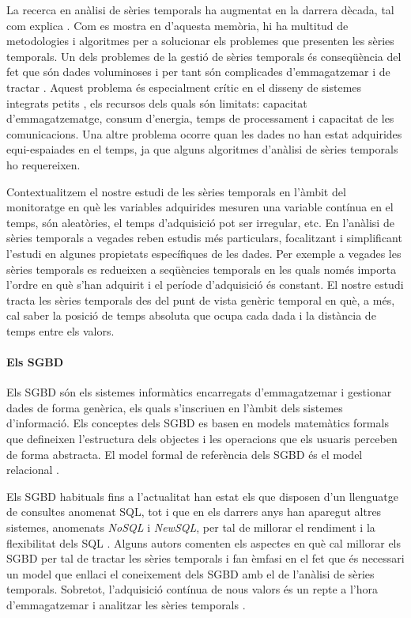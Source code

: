 La recerca en anàlisi de sèries temporals ha augmentat en la darrera
dècada, tal com explica \textcite{fu11}.  Com es mostra en
 d'aquesta memòria, hi ha multitud de metodologies
i algoritmes per a solucionar els problemes que presenten les sèries
temporals. Un dels problemes de la gestió de sèries temporals és
conseqüència del fet que són dades voluminoses i per tant són
complicades d'emmagatzemar i de tractar \cite{fu11,keogh08:isax}.
Aquest problema és especialment crític en el disseny de sistemes
integrats petits \cite{yaogehrke02}, els recursos dels quals són
limitats: capacitat d'emmagatzematge, consum d'energia, temps de
processament i capacitat de les comunicacions.  Una altre problema
ocorre quan les dades no han estat adquirides equi-espaiades en el
temps, ja que alguns algoritmes d'anàlisi de sèries temporals ho
requereixen.

Contextualitzem el nostre estudi de les sèries temporals en l'àmbit
del monitoratge en què les variables adquirides mesuren una variable
contínua en el temps, són aleatòries, el temps d'adquisició pot ser
irregular, etc.  En l'anàlisi de sèries temporals a vegades reben
estudis més particulars, focalitzant i simplificant l'estudi en
algunes propietats específiques de les dades. Per exemple a vegades
les sèries temporals es redueixen a seqüències temporals en les quals
només importa l'ordre en què s'han adquirit i el període d'adquisició
és constant. El nostre estudi tracta les sèries temporals des del punt
de vista genèric temporal en què, a més, cal saber la posició de temps
absoluta que ocupa cada dada i la distància de temps entre els valors.






\paragraph{Els SGBD}
Els \gls{SGBD} són els sistemes informàtics encarregats d'emmagatzemar
i gestionar dades de forma genèrica, els quals s'inscriuen en l'àmbit
dels sistemes d'informació. Els conceptes dels \gls{SGBD} es basen en
models matemàtics formals que defineixen l'estructura dels objectes i
les operacions que els usuaris perceben de forma abstracta. El model
formal de referència dels \gls{SGBD} és el model
relacional \parencite{date04:introduction8}.


Els \gls{SGBD} habituals fins a l'actualitat han estat els que
disposen d'un llenguatge de consultes anomenat \gls{SQL}, tot i que en
els darrers anys han aparegut altres sistemes, anomenats \emph{NoSQL}
i \emph{NewSQL}, per tal de millorar el rendiment i la flexibilitat
dels
\gls{SQL} \parencite{atzeni13:relational_model_dead,stonebraker10,stonebraker09:scidb,zhang11}. Alguns
autors \parencite{dreyer94,schmidt95,stonebraker09:scidb,zhang11}
comenten els aspectes en què cal millorar els \gls{SGBD} per tal de
tractar les sèries temporals i fan èmfasi en el fet que és necessari
un model que enllaci el coneixement dels \gls{SGBD} amb el de
l'anàlisi de sèries temporals. Sobretot, l'adquisició contínua de nous
valors és un repte a l'hora d'emmagatzemar i analitzar les sèries
temporals \parencite{keogh97}. 

